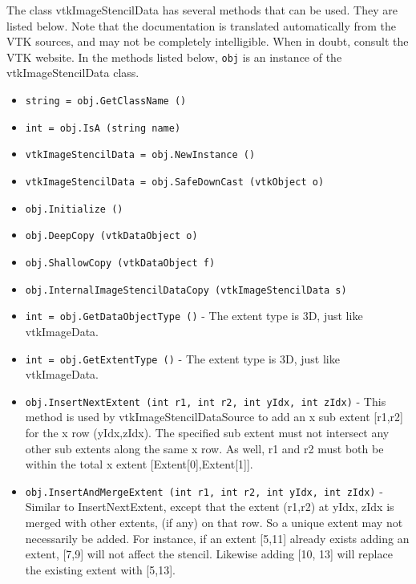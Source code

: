 The class vtkImageStencilData has several methods that can be used.
  They are listed below.
Note that the documentation is translated automatically from the VTK sources,
and may not be completely intelligible.  When in doubt, consult the VTK website.
In the methods listed below, \verb|obj| is an instance of the vtkImageStencilData class.
\begin{itemize}
\item  \verb|string = obj.GetClassName ()|

\item  \verb|int = obj.IsA (string name)|

\item  \verb|vtkImageStencilData = obj.NewInstance ()|

\item  \verb|vtkImageStencilData = obj.SafeDownCast (vtkObject o)|

\item  \verb|obj.Initialize ()|

\item  \verb|obj.DeepCopy (vtkDataObject o)|

\item  \verb|obj.ShallowCopy (vtkDataObject f)|

\item  \verb|obj.InternalImageStencilDataCopy (vtkImageStencilData s)|

\item  \verb|int = obj.GetDataObjectType ()| -  The extent type is 3D, just like vtkImageData.

\item  \verb|int = obj.GetExtentType ()| -  The extent type is 3D, just like vtkImageData.

\item  \verb|obj.InsertNextExtent (int r1, int r2, int yIdx, int zIdx)| -  This method is used by vtkImageStencilDataSource to add an x 
 sub extent [r1,r2] for the x row (yIdx,zIdx).  The specified sub
 extent must not intersect any other sub extents along the same x row.
 As well, r1 and r2 must both be within the total x extent
 [Extent[0],Extent[1]].

\item  \verb|obj.InsertAndMergeExtent (int r1, int r2, int yIdx, int zIdx)| -  Similar to InsertNextExtent, except that the extent (r1,r2) at yIdx, 
 zIdx is merged with other extents, (if any) on that row. So a 
 unique extent may not necessarily be added. For instance, if an extent 
 [5,11] already exists adding an extent, [7,9] will not affect the 
 stencil. Likewise adding [10, 13] will replace the existing extent 
 with [5,13].


\end{itemize}
